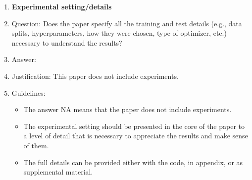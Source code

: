 \documentclass{article}
\begin{document}
\begin{enumerate}
\item {\bf Experimental setting/details}
    \item[] Question: Does the paper specify all the training and test details (e.g., data splits, hyperparameters, how they were chosen, type of optimizer, etc.) necessary to understand the results?
    \item[] Answer: \answerNA{} %
    \item[] Justification: This paper does not include experiments.
    \item[] Guidelines:
    \begin{itemize}
        \item The answer NA means that the paper does not include experiments.
        \item The experimental setting should be presented in the core of the paper to a level of detail that is necessary to appreciate the results and make sense of them.
        \item The full details can be provided either with the code, in appendix, or as supplemental material.
    \end{itemize}


\end{enumerate}
\end{document}
